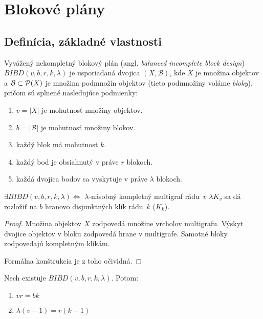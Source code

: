 \chapter{Blokové plány}

\section{Definícia, základné vlastnosti}

\begin{definition}

Vyvážený nekompletný blokový plán (angl. \emph{balanced incomplete block design}) $BIBD(v, b, r, k, \lambda)$ je usporiadaná dvojica $(X, \mathcal{B})$, kde $X$ je množina objektov a $\mathcal{B} \subset \mathcal{P}(X)$ je množina podmnožín objektov (tieto podmnožiny voláme \emph{bloky}), pričom sú splnené nasledujúce podmienky:

\begin{enumerate}
    \item $v = |X|$ je mohutnosť množiny objektov.
    \item $b = |\mathcal{B}|$ je mohutnosť množiny blokov.
    \item každý blok má mohutnosť $k$.
    \item každý bod je obsiahnutý v práve $r$ blokoch.
    \item každá dvojica bodov sa vyskytuje v práve $\lambda$ blokoch. 
\end{enumerate}
\end{definition}

\begin{theorem}
$\exists BIBD(v, b, r, k, \lambda) \Longleftrightarrow $ $\lambda$-násobný kompletný multigraf rádu~$v$ $\lambda K_v$
sa dá rozložiť na $b$ hranovo disjunktných klík rádu~$k$ ($K_k$).
\end{theorem}


\begin{proof}
Množina objektov $X$ zodpovedá množine vrcholov multigrafu. 
Výskyt dvojice objektov v bloku zodpovedá hrane v multigrafe.
Samotné bloky zodpovedajú kompletným klikám.

Formálna konštrukcia je z toho očividná.
\end{proof}

\begin{theorem}
\label{th:bibd_params}
Nech existuje $BIBD(v, b, r, k, \lambda)$. Potom:
\begin{enumerate}
    \item $vr = bk$
    \item $\lambda (v-1) = r (k-1)$
\end{enumerate}
\end{theorem}


